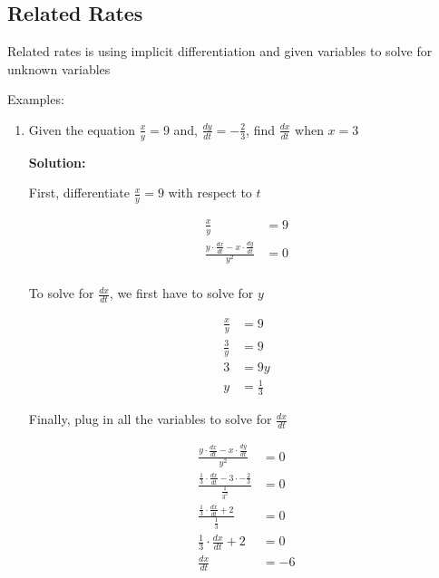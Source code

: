 \documentclass[12pt]{article}
\begin{document}
        \subsection{Related Rates}

        Related rates is using implicit differentiation and given variables to solve for unknown variables

        \noindent Examples:

        \begin{enumerate}
            
            \item Given the equation $\frac{x}{y} = 9$ and, $\frac{dy}{dt} = -\frac{2}{3}$, 
            find $\frac{dx}{dt}$ when $x = 3$

            \textbf{Solution: }

            First, differentiate $\frac{x}{y} = 9$ with respect to $t$

            \[
                \begin{aligned}
                    \frac{x}{y} &= 9 \\
                    \frac{y \cdot \frac{dx}{dt} - x \cdot \frac{dy}{dt}}{y^2} &= 0 \\
                \end{aligned}
            \]

            To solve for $\frac{dx}{dt}$, we first have to solve for $y$

            \[
                \begin{aligned}
                    \frac{x}{y} &= 9 \\
                    \frac{3}{y} &= 9 \\
                    3 &= 9y \\
                    y &= \frac{1}{3}
                \end{aligned}    
            \]

            Finally, plug in all the variables to solve for $\frac{dx}{dt}$

            \[
                \begin{aligned}
                    \frac{y \cdot \frac{dx}{dt} - x \cdot \frac{dy}{dt}}{y^2} &= 0 \\
                    \frac{\frac{1}{3} \cdot \frac{dx}{dt} - 3 \cdot -\frac{2}{3}}{\frac{1}{3^2}} &= 0 \\
                    \frac{\frac{1}{3} \cdot \frac{dx}{dt} + 2}{\frac{1}{3}} &= 0 \\
                    \frac{1}{3} \cdot \frac{dx}{dt} + 2 &= 0 \\
                    \frac{dx}{dt} &= -6
                \end{aligned}    
            \]


\end{enumerate}
\end{document}

